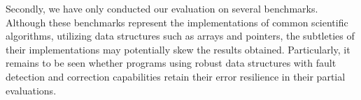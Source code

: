 Secondly, we have only conducted our evaluation on several benchmarks.
Although these benchmarks represent the implementations of common scientific algorithms, utilizing data structures such as arrays and pointers, the subtleties of their implementations may potentially skew the results obtained.
Particularly, it remains to be seen whether programs using robust data structures with fault detection and correction capabilities retain their error resilience in their partial evaluations.


